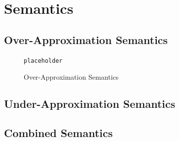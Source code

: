 \documentclass{kththesis}
\begin{document}
\section{Semantics}

\subsection{Over-Approximation Semantics}


\begin{figure}[h]
    \centering
\begin{lstlisting}
placeholder
\end{lstlisting}
\caption{Over-Approximation Semantics}
    \label{fig:overApproximationSemantics}
\end{figure}


\subsection{Under-Approximation Semantics}

\subsection{Combined Semantics}
\end{document}

